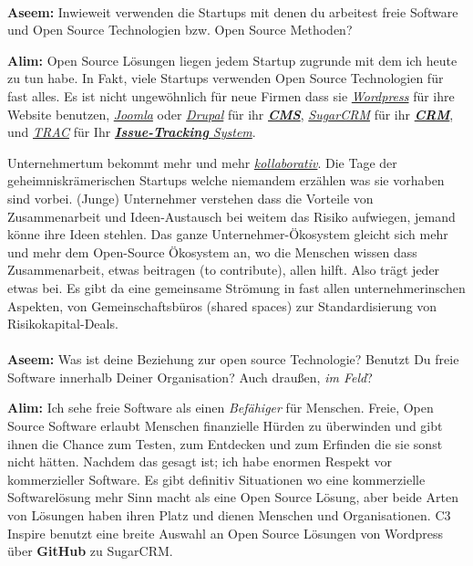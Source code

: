 \paragraph{}
\textbf{Aseem:} Inwieweit verwenden die Startups mit denen du arbeitest freie 
Software und Open Source Technologien bzw. Open Source Methoden?

\textbf{Alim:} Open Source Lösungen liegen jedem Startup zugrunde mit dem ich 
heute zu tun habe. In Fakt, viele Startups verwenden Open Source 
Technologien für fast alles. Es ist nicht ungewöhnlich für neue 
Firmen dass sie \href{http://wordpress.org/}{\textit{Wordpress}} für ihre Website 
benutzen, \href{http://www.joomla.de/}{\textit{Joomla}} oder \href{https://drupal.org/}{\textit{Drupal}} für ihr 
\href{https://de.wikipedia.org/wiki/Content-Management-System}{\textit{\textbf{CMS}}}, 
\href{https://de.wikipedia.org/wiki/SugarCRM}{\textit{SugarCRM}} für ihr 
\href{https://de.wikipedia.org/wiki/Customer-Relationship-Management}{\textit{\textbf{CRM}}}, und \href{https://de.wikipedia.org/wiki/Trac}{\textit{TRAC}} für Ihr 
\href{https://de.wikipedia.org/wiki/Issue-Tracking-System}{\textit{\textbf{Issue-Tracking} 
System}}.

Unternehmertum bekommt mehr und mehr \href{https://de.wikipedia.org/wiki/Kollaboration}{\textit{kollaborativ}}. Die Tage der 
geheimniskrämerischen Startups welche niemandem erzählen was sie 
vorhaben sind vorbei. (Junge) Unternehmer verstehen dass die Vorteile von 
Zusammenarbeit und Ideen-Austausch bei weitem das Risiko aufwiegen, 
jemand könne ihre Ideen stehlen. Das ganze Unternehmer-Ökosystem 
gleicht sich mehr und mehr dem Open-Source Ökosystem an, wo die 
Menschen wissen dass Zusammenarbeit, etwas beitragen (to contribute),  
allen hilft. Also trägt jeder etwas bei. Es gibt da eine gemeinsame 
Strömung in fast allen unternehmerinschen Aspekten, von 
Gemeinschaftsbüros (shared spaces) zur Standardisierung von 
Risikokapital-Deals.


\paragraph{}
\textbf{Aseem:} Was ist deine Beziehung zur open source Technologie? Benutzt 
Du freie Software innerhalb Deiner Organisation? Auch draußen, \textit{im 
Feld}?

\textbf{Alim:} Ich sehe freie Software als einen \textit{Befähiger} für Menschen. 
Freie, Open Source Software erlaubt Menschen finanzielle Hürden zu 
überwinden und gibt ihnen die Chance zum Testen, zum Entdecken und 
zum Erfinden die sie sonst nicht hätten. Nachdem das gesagt ist; ich 
habe enormen Respekt vor kommerzieller Software. Es gibt definitiv 
Situationen wo eine kommerzielle Softwarelösung mehr Sinn macht als 
eine Open Source Lösung, aber beide Arten von Lösungen haben ihren 
Platz und dienen Menschen und Organisationen. C3 Inspire benutzt eine 
breite Auswahl an Open Source Lösungen von Wordpress über \textbf{GitHub} zu 
SugarCRM.

